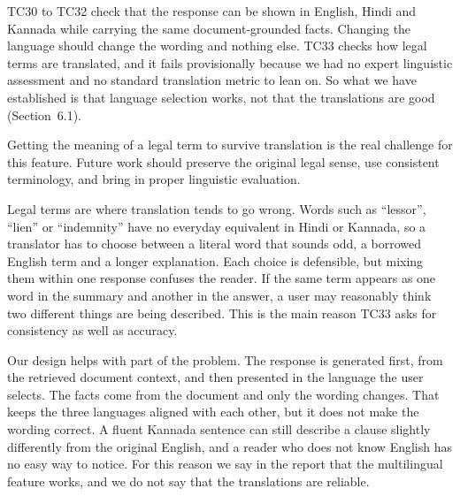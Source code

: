 \documentclass[12pt,a4paper,oneside]{report}
\begin{document}
TC30 to TC32 check that the response can be shown in English, Hindi and Kannada while carrying the same document-grounded facts. Changing the language should change the wording and nothing else. TC33 checks how legal terms are translated, and it fails provisionally because we had no expert linguistic assessment and no standard translation metric to lean on. So what we have established is that language selection works, not that the translations are good (Section~6.1).

Getting the meaning of a legal term to survive translation is the real challenge for this feature. Future work should preserve the original legal sense, use consistent terminology, and bring in proper linguistic evaluation.

Legal terms are where translation tends to go wrong. Words such as ``lessor'', ``lien'' or ``indemnity'' have no everyday equivalent in Hindi or Kannada, so a translator has to choose between a literal word that sounds odd, a borrowed English term and a longer explanation. Each choice is defensible, but mixing them within one response confuses the reader. If the same term appears as one word in the summary and another in the answer, a user may reasonably think two different things are being described. This is the main reason TC33 asks for consistency as well as accuracy.

Our design helps with part of the problem. The response is generated first, from the retrieved document context, and then presented in the language the user selects. The facts come from the document and only the wording changes. That keeps the three languages aligned with each other, but it does not make the wording correct. A fluent Kannada sentence can still describe a clause slightly differently from the original English, and a reader who does not know English has no easy way to notice. For this reason we say in the report that the multilingual feature works, and we do not say that the translations are reliable.

\end{document}
